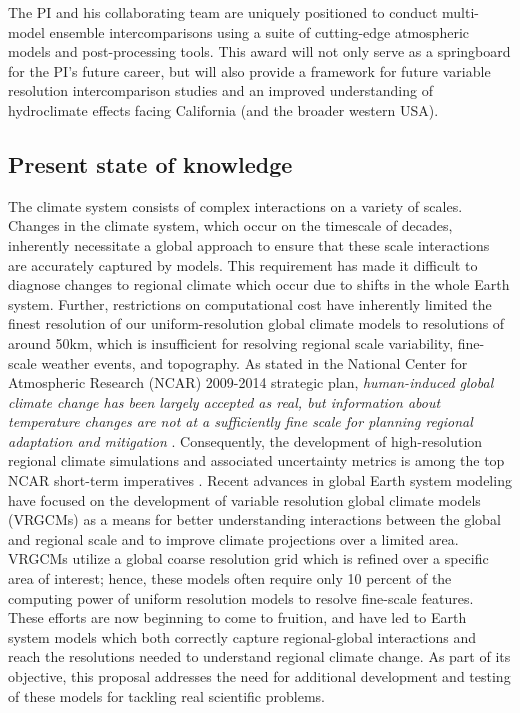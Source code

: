 \documentclass[11pt]{article}
\begin{document}
The PI and his collaborating team are uniquely positioned to conduct multi-model ensemble intercomparisons using a suite of cutting-edge atmospheric models and post-processing tools. This award will not only serve as a springboard for the PI's future career, but will also provide a framework for future variable resolution intercomparison studies and an improved understanding of hydroclimate effects facing California (and the broader western USA).

\subsection{Present state of knowledge}

The climate system consists of complex interactions on a variety of scales. Changes in the climate system, which occur on the timescale of decades, inherently necessitate a global approach to ensure that these scale interactions are accurately captured by models. This requirement has made it difficult to diagnose changes to regional climate which occur due to shifts in the whole Earth system. Further, restrictions on computational cost have inherently limited the finest resolution of our uniform-resolution global climate models to resolutions of around 50km, which is insufficient for resolving regional scale variability, fine-scale weather events, and topography. As stated in the National Center for Atmospheric Research (NCAR) 2009-2014 strategic plan, \textit{human-induced global climate change has been largely accepted as real, but information about temperature changes are not at a sufficiently fine scale for planning regional adaptation and mitigation} \citep{NCAR2009}. Consequently, the development of high-resolution regional climate simulations and associated uncertainty metrics is among the top NCAR short-term imperatives \citep{NCAR2009}. Recent advances in global Earth system modeling have focused on the development of variable resolution global climate models (VRGCMs) as a means for better understanding interactions between the global and regional scale and to improve climate projections over a limited area.  VRGCMs utilize a global coarse resolution grid which is refined over a specific area of interest; hence, these models often require only 10 percent of the computing power of uniform resolution models to resolve fine-scale features. These efforts are now beginning to come to fruition, and have led to Earth system models which both correctly capture regional-global interactions and reach the resolutions needed to understand regional climate change.   As part of its objective, this proposal addresses the need for additional development and testing of these models for tackling real scientific problems.
\end{document}
